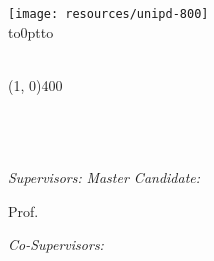 %


\begin{titlepage}
	\centering	
	
	\texttt{[image: resources/unipd-800]} \\[2mm]
	\vbox to0pt{\vbox to\vss}
	
	\scshape{\huge{{\thesisUniversity}}} \\
	\line(1, 0){400} \\[2mm]


	\textsf{\thesisUniversityDepartment} \\
	\textsf{\thesisUniversityGroup} \\

	\vfill
	{\LARGE \color{ctcolortitle}\textbf{\thesisTitle} \\[10mm]}


	\begin{center}

	\vfill
	\begin{normalsize}
	\begin{flushleft}	  
	  \textit{Supervisors:} \hfill \textit{Master Candidate:}\\
		\vspace{1pt}

		Prof. \Large \thesisFirstSupervisor \hfill {\Large \thesisName} \\

		\vspace{20pt}

		\normalsize \textit{Co-Supervisors:} \\
		\vspace{1pt}
		\thesisCoSupervisor


\end{flushleft}
\end{normalsize}
\end{center}
\end{titlepage}

